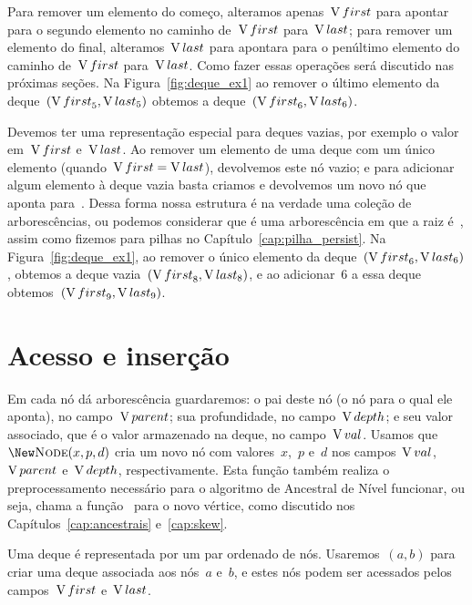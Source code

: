 \documentclass[main.tex]{subfiles}
\begin{document}
Para remover um elemento do começo, alteramos apenas~$\operatorname{V}{first}$ para apontar para o segundo elemento no caminho de~$\operatorname{V}{first}$ para~$\operatorname{V}{last}$; para remover um elemento do final, alteramos~$\operatorname{V}{last}$ para apontara para o penúltimo elemento do caminho de~$\operatorname{V}{first}$ para~$\operatorname{V}{last}$. Como fazer essas operações será discutido nas próximas seções. Na Figura~\ref{fig:deque_ex1} ao remover o último elemento da deque~$(\operatorname{V}{first}_5, \operatorname{V}{last}_5)$ obtemos a deque~$(\operatorname{V}{first}_6, \operatorname{V}{last}_6)$.

Devemos ter uma representação especial para deques vazias, por exemplo o valor~ em~$\operatorname{V}{first}$ e~$\operatorname{V}{last}$. Ao remover um elemento de uma deque com um único elemento (quando~$\operatorname{V}{first}=\operatorname{V}{last}$), devolvemos este nó vazio; e para adicionar algum elemento à deque vazia basta criamos e devolvemos um novo nó que aponta para~. Dessa forma nossa estrutura é na verdade uma coleção de arborescências, ou podemos considerar que é uma arborescência em que a raiz é~, assim como fizemos para pilhas no Capítulo~\ref{cap:pilha_persist}. Na Figura~\ref{fig:deque_ex1}, ao remover o único elemento da deque~$(\operatorname{V}{first}_6, \operatorname{V}{last}_6)$, obtemos a deque vazia~$(\operatorname{V}{first}_8, \operatorname{V}{last}_8)$, e ao adicionar~6 a essa deque obtemos~$(\operatorname{V}{first}_9, \operatorname{V}{last}_9)$.

\section{Acesso e inserção}

Em cada nó dá arborescência guardaremos: o pai deste nó (o nó para o qual ele aponta), no campo~$\operatorname{V}{parent}$; sua profundidade, no campo~$\operatorname{V}{depth}$; e seu valor associado, que é o valor armazenado na deque, no campo~$\operatorname{V}{val}$. Usamos que~$\New \Call{Node}{x, p, d}$ cria um novo nó com valores~$x$,~$p$ e~$d$ nos campos~$\operatorname{V}{val}$,~$\operatorname{V}{parent}$ e~$\operatorname{V}{depth}$, respectivamente. Esta função também realiza o preprocessamento necessário para o algoritmo de Ancestral de Nível funcionar, ou seja, chama a função~ para o novo vértice, como discutido nos Capítulos~\ref{cap:ancestrais} e~\ref{cap:skew}.

Uma deque é representada por um par ordenado de nós. Usaremos~$(a, b)$ para criar uma deque associada aos nós~$a$ e~$b$, e estes nós podem ser acessados pelos campos~$\operatorname{V}{first}$ e~$\operatorname{V}{last}$.
\end{document}

